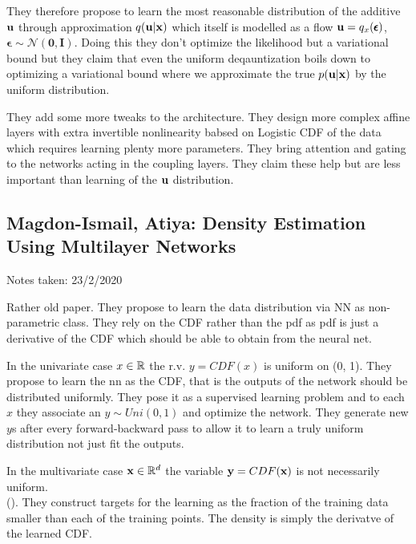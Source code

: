 They therefore propose to learn the most reasonable distribution of the additive $\mathbf{u}$ through approximation $q(\mathbf{u} | \mathbf{x})$ which itself is modelled as a flow $\mathbf{u} = q_x(\pmb{\epsilon})$, $\pmb{\epsilon} \sim \mathcal{N}(\mathbf{0}, \mathbf{I})$.
Doing this they don't optimize the likelihood but a variational bound but they claim that even the uniform deqauntization boils down to optimizing a variational bound where we approximate the true $p(\mathbf{u}| \mathbf{x})$ by the uniform distribution.

They add some more tweaks to the architecture. They design more complex affine layers with extra invertible nonlinearity babsed on Logistic CDF of the data which requires learning plenty more parameters. They bring attention and gating to the networks acting in the coupling layers. They claim these help but are less important than learning of the $\mathbf{u}$ distribution.


\subsection{Magdon-Ismail, Atiya: Density Estimation Using Multilayer Networks}

\begin{notebox}

\hfill Notes taken: 23/2/2020 
\end{notebox}

Rather old paper. They propose to learn the data distribution via NN as non-parametric class. They rely on the CDF rather than the pdf as pdf is just a derivative of the CDF which should be able to obtain from the neural net.

In the univariate case $x \in \mathbb{R}$ the r.v. $y=CDF(x)$ is uniform on (0, 1). They propose to learn the nn as the CDF, that is the outputs of the network should be distributed uniformly.
They pose it as a supervised learning problem and to each $x$ they associate an $y \sim Uni(0, 1)$ and optimize the network. They generate new $y$s after every forward-backward pass to allow it to learn a truly uniform distribution not just fit the outputs.

In the multivariate case $\mathbf{x} \in \mathbb{R}^d$ the variable $\mathbf{y} = CDF(\mathbf{x})$ is not necessarily uniform. \\
().
They construct targets for the learning as the fraction of the training data smaller than each of the training points. 
The density is simply the derivatve of the learned CDF.


